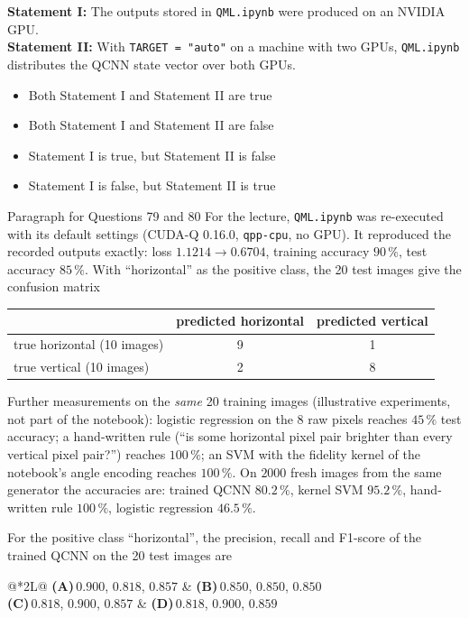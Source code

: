 \documentclass[11pt,a4paper]{article}
\newcommand{\optlabel}[1]{\textbf{(#1)}}
\newenvironment{qitem}[1]{\begin{list}{}{\setlength{\leftmargin}{3.3em}\setlength{\labelwidth}{3.1em}%
  \setlength{\labelsep}{0.2em}\setlength{\topsep}{3pt}\setlength{\parsep}{3pt}}\item[\textbf{Q.#1}\hfill]}{\end{list}}
\newcommand{\qsep}{\par\vspace{2pt}{\color{black!15}\hrule}\vspace{4pt}}
\begin{document}
\begin{qitem}{78}
\textbf{Statement I:} The outputs stored in \texttt{QML.ipynb} were produced on an NVIDIA GPU.\\[1mm]
\textbf{Statement II:} With \texttt{TARGET = "auto"} on a machine with two GPUs, \texttt{QML.ipynb} distributes the QCNN state vector over both GPUs.
\begin{itemize}[leftmargin=2.6em, labelsep=0.4em, itemsep=2pt, topsep=3pt]
\item[\optlabel{A}] Both Statement I and Statement II are true
\item[\optlabel{B}] Both Statement I and Statement II are false
\item[\optlabel{C}] Statement I is true, but Statement II is false
\item[\optlabel{D}] Statement I is false, but Statement II is true
\end{itemize}
\end{qitem}
\qsep

\begin{passagebox}{Paragraph for Questions 79 and 80}
For the lecture, \texttt{QML.ipynb} was re-executed with its default settings (CUDA-Q 0.16.0, \texttt{qpp-cpu}, no GPU).
It reproduced the recorded outputs exactly: loss $1.1214 \to 0.6704$, training accuracy $90\,\%$, test accuracy $85\,\%$.
With ``horizontal'' as the positive class, the 20 test images give the confusion matrix
\begin{center}\small
\begin{tabular}{lcc}\toprule & predicted horizontal & predicted vertical\\ \midrule
true horizontal (10 images) & 9 & 1\\ true vertical (10 images) & 2 & 8\\ \bottomrule\end{tabular}
\end{center}
Further measurements on the \emph{same} 20 training images (illustrative experiments, not part of the notebook):
logistic regression on the 8 raw pixels reaches $45\,\%$ test accuracy; a hand-written rule (``is some horizontal pixel pair
brighter than every vertical pixel pair?'') reaches $100\,\%$; an SVM with the fidelity kernel of the notebook's angle encoding
reaches $100\,\%$. On $2000$ fresh images from the same generator the accuracies are: trained QCNN $80.2\,\%$, kernel SVM
$95.2\,\%$, hand-written rule $100\,\%$, logistic regression $46.5\,\%$.
\end{passagebox}
\begin{qitem}{79}
For the positive class ``horizontal'', the precision, recall and F1-score of the trained QCNN on the 20 test images are
\par\smallskip\noindent\begin{tabularx}{\linewidth}{@{}*{2}{L}@{}}
\optlabel{A}\,$0.900$, $0.818$, $0.857$ & \optlabel{B}\,$0.850$, $0.850$, $0.850$ \\[3pt]
\optlabel{C}\,$0.818$, $0.900$, $0.857$ & \optlabel{D}\,$0.818$, $0.900$, $0.859$
\end{tabularx}
\end{qitem}
\qsep
\end{document}
